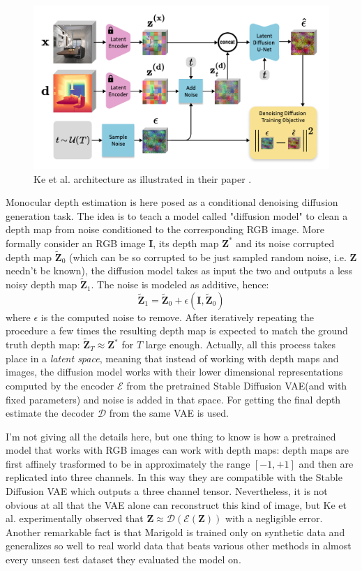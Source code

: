 \begin{figure}
	\centering
	\includegraphics[scale=0.3]{figs/marigold}
	\caption{Ke et al. architecture as illustrated in their paper \cite{Marigold}. \label{fig:marigold}}
\end{figure}

Monocular depth estimation is here posed as a conditional denoising diffusion generation task.
The idea is to teach a model called "diffusion model" to clean a depth map from noise conditioned to the corresponding RGB image.
More formally consider an RGB image $\mathbf{I}$, its depth map $\mathbf{Z}^{*}$ and its noise corrupted depth map $\tilde{\mathbf{Z}}_{0}$ (which can be so corrupted to be just sampled random noise, i.e. $\mathbf{Z}$ needn't be known), the diffusion model takes as input the two and outputs a less noisy depth map $\tilde{\mathbf{Z}}_{1}$.
The noise is modeled as additive, hence:
\[
	\tilde{\mathbf{Z}}_{1} = \tilde{\mathbf{Z}}_{0} + \epsilon(\mathbf{I}, \tilde{\mathbf{Z}}_{0})
\]
where $\epsilon$ is the computed noise to remove.
After iteratively repeating the procedure a few times the resulting depth map is expected to match the ground truth depth map: $\tilde{\mathbf{Z}}_{T} \approx \mathbf{Z}^{*}$ for $T$ large enough.
Actually, all this process takes place in a \textit{latent space}, meaning that instead of working with depth maps and images, the diffusion model works with their lower dimensional representations computed by the encoder $\mathcal{E}$ from the pretrained Stable Diffusion VAE(and with fixed parameters) and noise is added in that space.
For getting the final depth estimate the decoder $\mathcal{D}$ from the same VAE is used.

I'm not giving all the details here, but one thing to know is how a pretrained model that works with RGB images can work with depth maps: depth maps are first affinely trasformed to be in approximately the range $[-1, +1]$ and then are replicated into three channels.
In this way they are compatible with the Stable Diffusion VAE which outputs a three channel tensor.
Nevertheless, it is not obvious at all that the VAE alone can reconstruct this kind of image, but Ke et al. experimentally observed that $\mathbf{Z} \approx \mathcal{D}(\mathcal{E}(\mathbf{Z}))$ with a negligible error.
Another remarkable fact is that Marigold is trained only on synthetic data and generalizes so well to real world data that beats various other methods in almost every unseen test dataset they evaluated the model on.